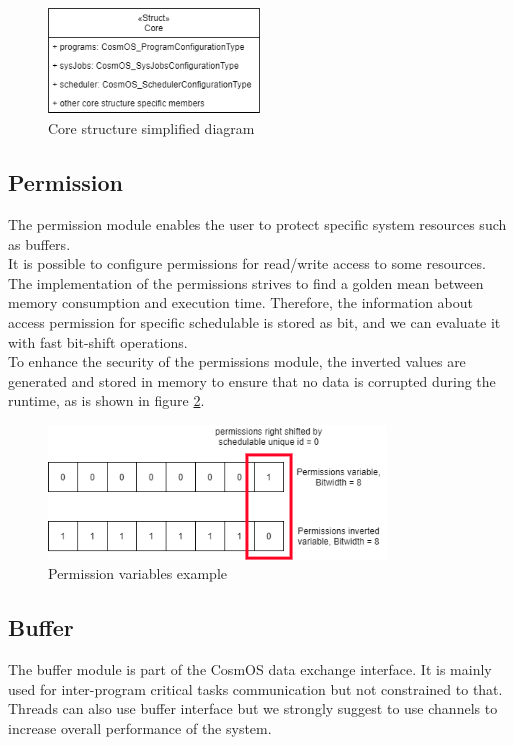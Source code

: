 \begin{figure}[H]
\begin{center}
\includegraphics[width=0.5\textwidth]{images/core_structure.png}
\caption{Core structure simplified diagram}
\label{fig:coreStructure}
\end{center}
\end{figure}

\subsection{Permission}\label{Permission}
The permission module enables the user to protect specific system resources such as buffers.\\
\indent It is possible to configure permissions for read/write access to some resources.
The implementation of the permissions strives to find a golden mean between memory consumption and execution time. Therefore, the information about access permission for specific schedulable is stored as bit, and we can evaluate it with fast bit-shift operations.\\
\indent To enhance the security of the permissions module, the inverted values are generated and stored in memory to ensure that no data is corrupted during the runtime, as is shown in figure \ref{fig:Permissions}.


\begin{figure}[H]
\begin{center}
\includegraphics[width=0.8\textwidth]{images/permissions.png}
\caption{Permission variables example}
\label{fig:Permissions}
\end{center}
\end{figure}

\subsection{Buffer}
The buffer module is part of the CosmOS data exchange interface. It is mainly used for inter-program critical tasks communication but not constrained to that. Threads can also use buffer interface but we strongly suggest to use channels to increase overall performance of the system.

